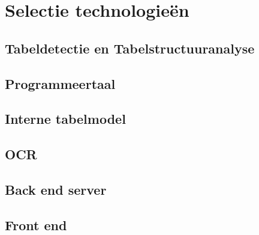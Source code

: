 \section{Selectie technologieën}
\label{sec:selectie-technologieën}

\subsection{Tabeldetectie en Tabelstructuuranalyse}

\subsection{Programmeertaal}

\subsection{Interne tabelmodel}

\subsection{OCR}

\subsection{Back end server}

\subsection{Front end}

\label{sec:evaluatie-ysteem}
